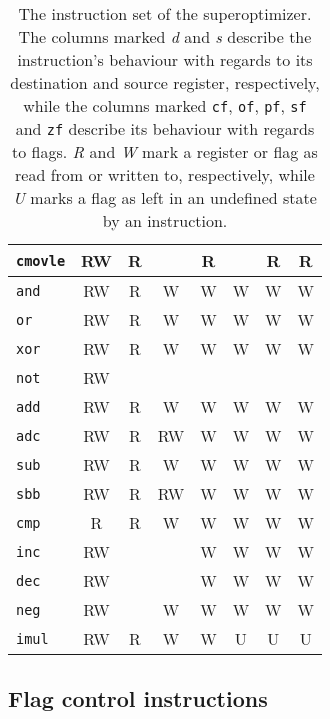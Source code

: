\documentclass[a4paper,11pt]{kth-mag}
\begin{document}
\begin{table}
\begin{tabular}{l|cc|ccccc}
\verb|cmovle| & RW & R  &           & R         &           & R         & R         \\
\hline
\verb|and|    & RW & R  & W         & W         & W         & W         & W         \\
\verb|or|     & RW & R  & W         & W         & W         & W         & W         \\
\verb|xor|    & RW & R  & W         & W         & W         & W         & W         \\
\verb|not|    & RW &    &           &           &           &           &           \\
\hline
\verb|add|    & RW & R  & W         & W         & W         & W         & W         \\
\verb|adc|    & RW & R  & RW        & W         & W         & W         & W         \\
\verb|sub|    & RW & R  & W         & W         & W         & W         & W         \\
\verb|sbb|    & RW & R  & RW        & W         & W         & W         & W         \\
\verb|cmp|    & R  & R  & W         & W         & W         & W         & W         \\
\verb|inc|    & RW &    &           & W         & W         & W         & W         \\
\verb|dec|    & RW &    &           & W         & W         & W         & W         \\
\verb|neg|    & RW &    & W         & W         & W         & W         & W         \\
\hline
\verb|imul|   & RW & R  & W         & W         & U         & U         & U         \\
\end{tabular}
\caption{The instruction set of the superoptimizer.
The columns marked \emph{d} and \emph{s} describe the instruction's behaviour with regards to its destination and source register, respectively,
while the columns marked \texttt{cf}, \texttt{of}, \texttt{pf}, \texttt{sf} and \texttt{zf} describe its behaviour with regards to flags.
\emph{R} and \emph{W} mark a register or flag as read from or written to, respectively, while \emph{U} marks a flag as left in an undefined state by an instruction.}
\label{tab:insns}
\end{table}

\subsection{Flag control instructions}
\end{document}
